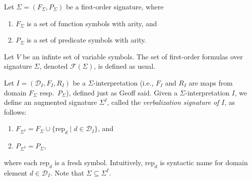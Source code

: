 \documentclass{article}
\begin{document}
Let $\Sigma = (F_\Sigma, P_\Sigma)$ be a first-order signature, where
\begin{enumerate}
  \item $F_\Sigma$ is a set of function symbols with arity, and
  \item $P_\Sigma$ is a set of predicate symbols with arity.
\end{enumerate}
Let $V$ be an infinte set of variable symbols.
The set of first-order formulas over signature $\Sigma$, denoted $\mathcal{F}(\Sigma)$, is defined as usual. 

Let $I = (\mathcal{D}_I, F_I, R_I)$ be a $\Sigma$-interpretation (i.e., $F_I$ and $R_I$ are maps from domain $F_\Sigma$ resp.\ $P_\Sigma$), defined just as Geoff said. 
Given a $\Sigma$-interpretation $I$, we define an augmented signature $\Sigma^I$, called the \emph{verbalization signature of $I$}, as follows:
\begin{enumerate}
  \item $F_{\Sigma^I} = F_\Sigma \cup \{ \mathrm{rep}_d \mid d \in \mathcal{D}_I \}$, and
  \item $P_{\Sigma^I} = P_\Sigma$,
\end{enumerate}
where each $\mathrm{rep}_d$ is a fresh symbol.
Intuitively, $\mathrm{rep}_d$ is syntactic name for domain element $d \in \mathcal{D}_I$. Note that $\Sigma \subseteq \Sigma^I$.
\end{document}
